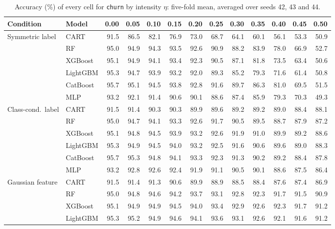 \documentclass[pdflatex,sn-mathphys]{sn-jnl}
\theoremstyle{thmstyleone}
\begin{document}
\begin{table}[htbp]
\centering
\tiny
\setlength{\tabcolsep}{2.6pt}
\caption{Accuracy (\%) of every cell for \texttt{churn} by intensity $\eta$: five-fold mean, averaged over seeds 42, 43 and 44.}
\label{tab:grid_churn}
\begin{tabular}{@{}llrrrrrrrrrrr@{}}
\toprule
Condition & Model & 0.00 & 0.05 & 0.10 & 0.15 & 0.20 & 0.25 & 0.30 & 0.35 & 0.40 & 0.45 & 0.50 \\
\midrule
Symmetric label & CART & 91.5 & 86.5 & 82.1 & 76.9 & 73.0 & 68.7 & 64.1 & 60.1 & 56.1 & 53.3 & 50.9 \\
 & RF & 95.0 & 94.9 & 94.3 & 93.5 & 92.6 & 90.9 & 88.2 & 83.9 & 78.0 & 66.9 & 52.7 \\
 & XGBoost & 95.1 & 94.9 & 94.1 & 93.4 & 92.3 & 90.5 & 87.1 & 81.8 & 73.5 & 63.4 & 50.6 \\
 & LightGBM & 95.3 & 94.7 & 93.9 & 93.2 & 92.0 & 89.3 & 85.2 & 79.3 & 71.6 & 61.4 & 50.8 \\
 & CatBoost & 95.7 & 95.1 & 94.5 & 93.8 & 92.8 & 91.6 & 89.7 & 86.3 & 81.0 & 69.5 & 51.5 \\
 & MLP & 93.2 & 92.1 & 91.4 & 90.6 & 90.1 & 88.6 & 87.4 & 85.9 & 79.3 & 70.3 & 49.3 \\
\midrule
Class-cond.\ label & CART & 91.5 & 91.4 & 90.3 & 90.3 & 89.9 & 89.6 & 89.2 & 89.2 & 89.0 & 88.4 & 88.1 \\
 & RF & 95.0 & 94.7 & 94.1 & 93.3 & 92.6 & 91.7 & 90.5 & 89.5 & 88.7 & 87.9 & 87.2 \\
 & XGBoost & 95.1 & 94.8 & 94.5 & 93.9 & 93.2 & 92.6 & 91.9 & 91.0 & 89.9 & 89.2 & 88.6 \\
 & LightGBM & 95.3 & 94.9 & 94.5 & 94.0 & 93.2 & 92.5 & 91.6 & 90.6 & 89.6 & 89.0 & 88.3 \\
 & CatBoost & 95.7 & 95.3 & 94.8 & 94.1 & 93.3 & 92.3 & 91.3 & 90.2 & 89.2 & 88.4 & 87.8 \\
 & MLP & 93.2 & 92.8 & 92.6 & 92.4 & 91.9 & 91.1 & 90.5 & 90.1 & 88.6 & 87.5 & 86.4 \\
\midrule
Gaussian feature & CART & 91.5 & 91.4 & 91.3 & 90.6 & 89.9 & 88.9 & 88.5 & 88.4 & 87.6 & 87.4 & 86.9 \\
 & RF & 95.0 & 94.8 & 94.6 & 94.2 & 93.7 & 93.1 & 92.8 & 92.3 & 91.7 & 91.5 & 90.9 \\
 & XGBoost & 95.1 & 94.9 & 94.9 & 94.5 & 94.0 & 93.4 & 92.9 & 92.6 & 92.3 & 91.7 & 91.2 \\
 & LightGBM & 95.3 & 95.2 & 94.9 & 94.6 & 94.1 & 93.6 & 93.1 & 92.6 & 92.1 & 91.6 & 91.2 \\

\end{tabular}
\end{table}
\end{document}
